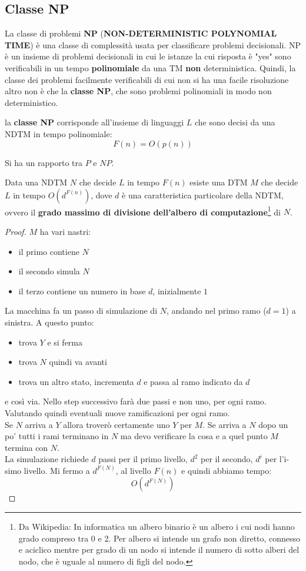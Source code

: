 \subsection{Classe NP}
La classe di problemi \textbf{NP} (\textbf{NON-DETERMINISTIC POLYNOMIAL TIME}) è una classe di complessità usata per classificare problemi decisionali. NP è un insieme di problemi decisionali in cui le istanze la cui risposta è "yes" sono verificabili in un tempo \textbf{polinomiale} da una TM \textbf{non} deterministica.
Quindi, la classe dei problemi facilmente verificabili di cui non si ha una facile
risoluzione altro non è che la \textbf{classe NP}, che sono problemi polinomiali
in modo non deterministico.
\begin{definizione}
  la \textbf{classe NP} corrisponde all'insieme di linguaggi $L$ che sono decisi
  da una NDTM in tempo polinomiale:
  \[F(n)=O(p(n))\]
\end{definizione}
Si ha un rapporto tra $P$ e $NP$.
\begin{definizione}
  Data una NDTM $N$ che decide $L$ in tempo $F(n)$ esiste una DTM $M$ che decide
  $L$ in tempo $O(d^{F(n)})$, dove $d$ è una caratteristica particolare della
  NDTM, ovvero il \textbf{grado massimo di divisione dell'albero di
    computazione}\footnote{Da Wikipedia: In informatica un albero binario è un albero i cui nodi hanno grado compreso tra 0 e 2. Per albero si intende un grafo non diretto, connesso e aciclico mentre per grado di un nodo si intende il numero di sotto alberi del nodo, che è uguale al numero di figli del nodo.} di $N$. 
\end{definizione}
\begin{proof}
  $M$ ha vari nastri:
  \begin{itemize}
    \item il primo contiene $N$
    \item il secondo simula $N$
    \item il terzo contiene un numero in base $d$, inizialmente $1$
  \end{itemize}
  La macchina fa un passo di simulazione di $N$, andando nel primo ramo ($d=1$)
  a sinistra. A questo punto:
  \begin{itemize}
    \item trova $Y$ e si ferma
    \item trova $N$ quindi va avanti
    \item trova un altro stato, incrementa $d$ e passa al ramo indicato da
    $d$
  \end{itemize}
  e così via. Nello step successivo farà due passi e non uno, per ogni
  ramo. Valutando quindi eventuali nuove ramificazioni per ogni ramo. \\
  Se $N$ arriva a $Y$ allora troverò certamente uno $Y$ per $M$. Se arriva a $N$
  dopo un po' tutti i rami terminano in $N$ ma devo verificare la cosa e a quel
  punto $M$ termina con $N$.\\
  La simulazione richiede $d$ passi per il primo livello, $d^2$ per il secondo,
  $d^i$ per l'i-simo livello. Mi fermo a $d^{F(N)}$, al livello $F(n)$ e quindi
  abbiamo tempo: 
  \[O(d^{F(N)})\]
\end{proof}

